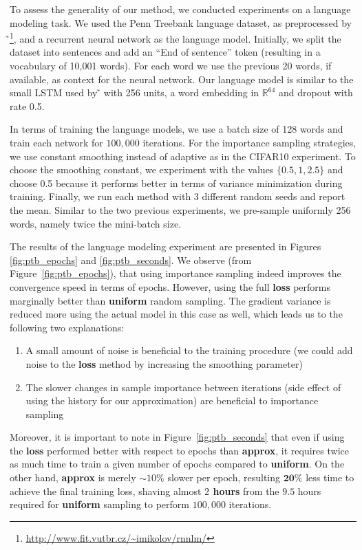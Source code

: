 \documentclass{article}
\newcommand{\citet}[1]{\citeauthor{#1} ̃\shortcite{#1}}
\begin{document}
To assess the generality of our method, we  conducted experiments on a language
modeling task. We used the Penn Treebank language dataset, as preprocessed by
\citet{mikolov2011empirical}\footnote{\url{http://www.fit.vutbr.cz/~imikolov/rnnlm/}},
and a recurrent neural network as the language model. Initially, we split the
dataset into sentences and add an ``End of sentence'' token (resulting in a
vocabulary of 10,001 words). For each word we use the previous 20 words, if
available, as context for the neural network. Our language model is similar to
the small LSTM used by \citet{zaremba2014recurrent} with 256 units, a word
embedding in $\mathbb{R}^{64}$ and dropout with rate 0.5.

In terms of training the language models, we use a batch size of 128 words and
train each network for $100,000$ iterations. For the importance sampling
strategies, we use constant smoothing instead of adaptive as in the CIFAR10
experiment. To choose the smoothing constant, we experiment with the values
$\{0.5, 1, 2.5\}$ and choose 0.5 because it performs better in terms of
variance minimization during training. Finally, we run each method with 3
different random seeds and report the mean. Similar to the two previous
experiments, we pre-sample uniformly 256 words, namely twice the mini-batch
size.

The results of the language modeling experiment are presented in Figures
\ref{fig:ptb_epochs} and \ref{fig:ptb_seconds}. We observe (from
Figure~\ref{fig:ptb_epochs}), that using importance sampling indeed improves
the convergence speed in terms of epochs. However, using the full \textbf{loss}
performs marginally better than \textbf{uniform} random sampling. The gradient
variance is reduced more using the actual model in this case as well, which
leads us to the following two explanations:
\begin{enumerate}
    \item A small amount of noise is beneficial to the training procedure (we
    could add noise to the \textbf{loss} method by increasing the smoothing
    parameter)
    \item The slower changes in sample importance between iterations (side
    effect of using the history for our approximation) are beneficial to
    importance sampling
\end{enumerate}
Moreover, it is important to note in Figure~\ref{fig:ptb_seconds} that even if
using the \textbf{loss} performed better with respect to epochs than
\textbf{approx}, it requires twice as much time to train a given number of
epochs compared to \textbf{uniform}. On the other hand, \textbf{approx} is
merely $\sim 10\%$ slower per epoch, resulting $\mathbf{20\%}$ less time to
achieve the final training loss, shaving almost \textbf{$2$ hours} from the
$9.5$ hours required for \textbf{uniform} sampling to perform $100,000$
iterations.
\end{document}
